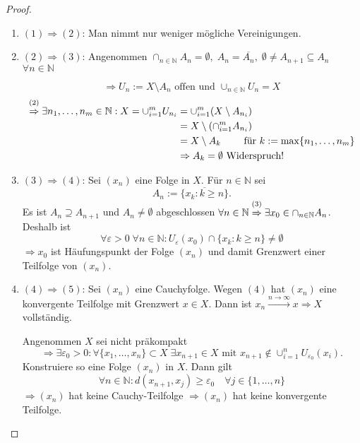 \documentclass[ngerman]{report}
\theoremstyle{plain}%
\theoremstyle{definition}%
\theoremstyle{myStyle}
\newcommand{\N}{\mathbb{N}}
\newcommand{\df}[1][]{%
	\overset{#1}{\Rightarrow}
}
\begin{document}
\begin{proof}
\begin{enumerate}[]
	\item $(1) \df (2)$: Man nimmt nur weniger mögliche Vereinigungen.
	
	\item $(2) \df (3)$: Angenommen $\cap_{n\in\N}{A_n} = \emptyset,\;A_n = \overline{A_n},\;\emptyset \not = A_{n+1} \subseteq A_n$ $\forall n\in\N$\par
	$$\df U_n := X\setminus A_n \text{ offen und }\cup_{n\in\N} U_n = X$$
	\begin{equation*}
	\begin{split}
		\overset{(2)}{\df} \exists n_1,\dots,n_m\in\N : X = \cup^m_{i=1} U_{n_i} & = \cup^m_{i=1} (X\setminus A_{n_i}) 
		\\ & = X \setminus (\cap^m_{i=1} A_{n_i})
		\\ & = X \setminus A_k\qquad \text{ für } k := \max \{n_1,\dots,n_m\}
		\\ & \df A_k = \emptyset \text{ Widerspruch!}
	\end{split}
	\end{equation*}
	
	\item $(3) \df (4)$: Sei $(x_n)$ eine Folge in  $X$. Für $n\in\N$ sei $$A_n:=\overline{\{x_k : k \geq n\}}.$$ 
	Es ist $A_n \supseteq A_{n+1}$ und $A_n \not= \emptyset$ abgeschlossen $\forall n\in\N \overset{(3)}{\df} \exists x_0 \in \cap_{n\in\N} A_n$. 
	Deshalb ist 
	$$\forall \varepsilon > 0 \;\forall n\in\N:U_\varepsilon (x_0) \cap \{x_k : k \geq n \} \not = \emptyset$$ 
	$\df x_0$ ist Häufungspunkt der Folge $(x_n)$ und damit Grenzwert einer Teilfolge von $(x_n)$.
	\item $(4) \df (5)$: Sei $(x_n)$ eine Cauchyfolge. Wegen $(4)$ hat $(x_n)$ eine konvergente Teilfolge mit Grenzwert $x\in X$. 
	Dann ist $x_n\overset{n\to\infty}{\longrightarrow} x \df X$ vollständig.\par 
	Angenommen $X$ sei nicht präkompakt 
	$$\Rightarrow \exists
	\varepsilon_0 > 0 : \forall\{x_1,\dots,x_n\}\subset X \;\exists x_{n+1} 
	\in X \text{ mit }x_{n+1} \not \in \cup^n_{i=1} U_{\varepsilon_0}(x_i).$$
	Konstruiere so eine Folge $(x_n)$ in $X$. Dann gilt 
	$$\forall n\in\N: d(x_{n+1},x_j) \geq \varepsilon_0\quad \forall j \in \{1,\dots,n\}$$
	$\df (x_n)$ hat keine Cauchy-Teilfolge $\df (x_n)$ hat keine konvergente Teilfolge.


\end{enumerate}
\end{proof}
\end{document}
